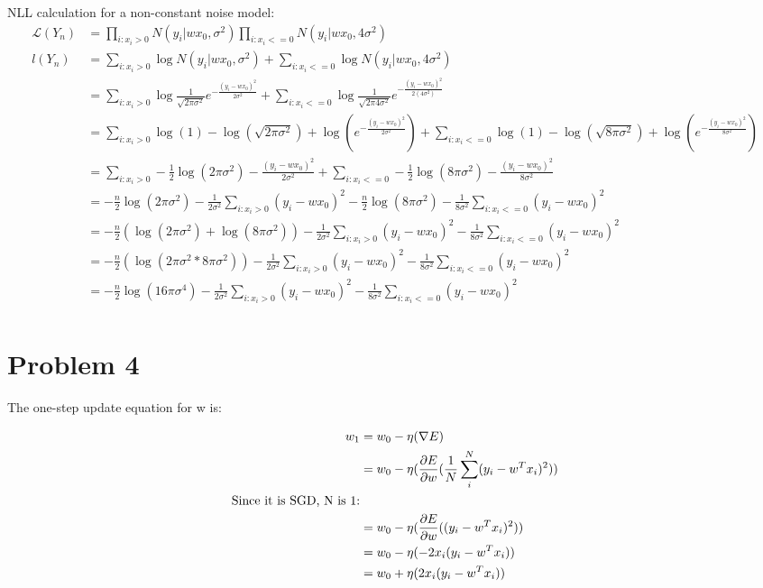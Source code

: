 \documentclass{article}
\begin{document}
NLL calculation for a non-constant noise model:
\begin{align*}
    \mathcal{L}(Y_n) &= \prod_{i:x_i>0} N(y_i \vert wx_0, \sigma^2) \prod_{i:x_i<=0} N(y_i \vert wx_0, 4\sigma^2) \\
    l(Y_n) &= \sum_{i:x_i>0} \log N(y_i \vert wx_0, \sigma^2) + \sum_{i:x_i<=0} \log N(y_i \vert wx_0, 4\sigma^2) \\
    &= \sum_{i:x_i>0} \log \frac{1}{\sqrt{2\pi\sigma^2}}e^{-\frac{(y_i-wx_0)^2}{2\sigma^2}} + \sum_{i:x_i<=0} \log \frac{1}{\sqrt{2\pi4\sigma^2}}e^{-\frac{(y_i-wx_0)^2}{2(4\sigma^2)}} \\
    &= \sum_{i:x_i>0} \log (1) - \log(\sqrt{2\pi\sigma^2})+ \log (e^{-\frac{(y_i-wx_0)^2}{2\sigma^2}}) + \sum_{i:x_i<=0} \log (1) - \log(\sqrt{8\pi\sigma^2})+ \log (e^{-\frac{(y_i-wx_0)^2}{8\sigma^2}}) \\
    &= \sum_{i:x_i>0} -\frac{1}{2}\log(2\pi\sigma^2) - \frac{(y_i-wx_0)^2}{2\sigma^2} + \sum_{i:x_i<=0} -\frac{1}{2}\log(8\pi\sigma^2) - \frac{(y_i-wx_0)^2}{8\sigma^2} \\
    &= -\frac{n}{2}\log(2\pi\sigma^2) - \frac{1}{2\sigma^2}\sum_{i:x_i>0}(y_i-wx_0)^2 - \frac{n}{2}\log(8\pi\sigma^2) - \frac{1}{8\sigma^2}\sum_{i:x_i<=0}(y_i-wx_0)^2 \\
    &= -\frac{n}{2}(\log(2\pi\sigma^2)+\log(8\pi\sigma^2)) - \frac{1}{2\sigma^2}\sum_{i:x_i>0}(y_i-wx_0)^2 - \frac{1}{8\sigma^2}\sum_{i:x_i<=0}(y_i-wx_0)^2 \\
    &= -\frac{n}{2}(\log(2\pi\sigma^2*8\pi\sigma^2)) - \frac{1}{2\sigma^2}\sum_{i:x_i>0}(y_i-wx_0)^2 - \frac{1}{8\sigma^2}\sum_{i:x_i<=0}(y_i-wx_0)^2 \\
    &= -\frac{n}{2}\log(16\pi\sigma^4) - \frac{1}{2\sigma^2}\sum_{i:x_i>0}(y_i-wx_0)^2 - \frac{1}{8\sigma^2}\sum_{i:x_i<=0}(y_i-wx_0)^2 \\
\end{align*}

\section{Problem 4}
The one-step update equation for w is:

\begin{align*}
    w_1 &= w_0 - \eta(\nabla E) \\
    &= w_0 - \eta(\pdv{E}{w}(\frac{1}{N}\sum_{i}^{N}(y_i-w^Tx_i)^2)) \\
\text{Since it is SGD, N is 1:}\\
    &= w_0 - \eta(\pdv{E}{w}((y_i-w^Tx_i)^2)) \\
    &= w_0 - \eta(-2x_i(y_i-w^Tx_i)) \\
    &= w_0 + \eta(2x_i(y_i-w^Tx_i)) \\
\end{align*}
\end{document}
